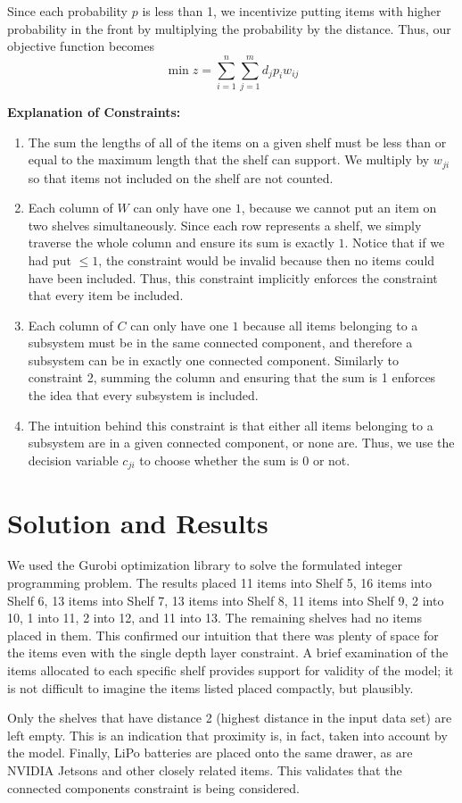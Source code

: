 \documentclass[10pt]{article}
\theoremstyle{named}
\begin{document}
Since each probability $p$ is less than 1, we incentivize putting items with higher probability
in the front by multiplying the probability by the distance. Thus, our objective function
becomes
$$\min z = \sum_{i = 1}^{n}\sum_{j = 1}^{m} d_j p_i w_{ij}$$

\textbf{Explanation of Constraints:}
\begin{enumerate}
\item The sum the lengths of all of the items on a given shelf must be less than or equal to
  the maximum length that the shelf can support. We multiply by $w_{ji}$ so that
  items not included on the shelf are not counted.
\item Each column of $W$ can only have one $1$, because we cannot put an item
  on two shelves simultaneously. Since each row represents a shelf, we simply
  traverse the whole column and ensure its sum is exactly $1$. Notice that if
  we had put $\leq 1$, the constraint would be invalid because then
  no items could have been included. Thus, this constraint implicitly enforces
  the constraint that every item be included.
\item Each column of $C$ can only have one $1$ because all items belonging to
  a subsystem must be in the same connected component, and therefore a subsystem
  can be in exactly one connected component. Similarly to constraint 2, summing
  the column and ensuring that the sum is 1 enforces the idea that every subsystem is
  included.
\item The intuition behind this constraint is that either all items belonging
  to a subsystem are in a given connected component, or none are. Thus, we
  use the decision variable $c_{ji}$ to choose whether the sum is $0$ or not. 
\end{enumerate}

\section{Solution and Results}
We used the Gurobi optimization library to solve the formulated integer programming
problem. The results placed 11 items into Shelf 5, 16 items into Shelf 6, 13 items
into Shelf 7, 13 items into Shelf 8, 11 items into Shelf 9, 2 into 10, 1 into 11,
2 into 12, and 11 into 13. The remaining shelves had no items placed in them.
This confirmed our intuition that there was plenty of space for the items
even with the single depth layer constraint. A brief examination of the items
allocated to each specific shelf provides support for validity of the model;
it is not difficult to imagine the items listed placed compactly, but plausibly.
\par
Only the shelves that have distance 2 (highest distance in the input data set)
are left empty. This is an indication that proximity is, in fact, taken into
account by the model. Finally, LiPo batteries are placed onto the same drawer,
as are NVIDIA Jetsons and other closely related items. This validates that the
connected components constraint is being considered.
\end{document}
